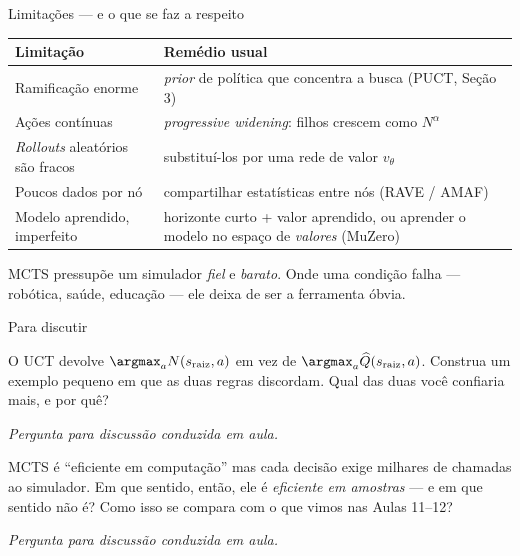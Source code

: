\documentclass[aspectratio=169, 11pt]{beamer}
\newcommand{\paradiscussao}{\smallskip
  {\footnotesize\color{rlCinza}\itshape Pergunta para discussão conduzida em aula.}}
\newcommand{\Nv}[1]{N(#1)}                      %
\newcommand{\Qh}{\widehat{Q}}                   %
\newcommand{\raiz}{s_{\mathrm{raiz}}}
\begin{document}
\begin{frame}{Limitações --- e o que se faz a respeito}
  \centering
  {\small
  \begin{tabular}{@{}p{4.3cm}p{7.4cm}@{}}
    \toprule
    \textbf{Limitação} & \textbf{Remédio usual} \\
    \midrule
    Ramificação enorme &
      \emph{prior} de política que concentra a busca (PUCT, Seção 3) \\
    Ações contínuas &
      \emph{progressive widening}: filhos crescem como $N^{\alpha}$ \\
    \emph{Rollouts} aleatórios são fracos &
      substituí-los por uma rede de valor $v_\theta$ \\
    Poucos dados por nó &
      compartilhar estatísticas entre nós (RAVE / AMAF) \\[-0.1em]
    Modelo aprendido, imperfeito &
      horizonte curto + valor aprendido, ou aprender o modelo no espaço de
      \emph{valores} (MuZero) \\
    \bottomrule
  \end{tabular}}

  \vspace{-4pt}
  \raggedright
  \begin{alertabox}
    MCTS pressupõe um simulador \emph{fiel} e \emph{barato}. Onde uma condição falha --- robótica, saúde, educação --- ele deixa de ser a ferramenta óbvia.
  \end{alertabox}
\end{frame}

\begin{frame}{Para discutir}
  \begin{quizbox}{}
    O UCT devolve $\argmax_a \Nv{\raiz,a}$ em vez de $\argmax_a \Qh(\raiz,a)$.
    Construa um exemplo pequeno em que as duas regras discordam. Qual das duas
    você confiaria mais, e por quê?
  \end{quizbox}
  \paradiscussao

  \pause
  \vfill
  \begin{quizbox}{}
    MCTS é ``eficiente em computação'' mas cada decisão exige milhares de
    chamadas ao simulador. Em que sentido, então, ele é \emph{eficiente em
    amostras} --- e em que sentido não é? Como isso se compara com o que vimos
    nas Aulas 11--12?
  \end{quizbox}
  \paradiscussao
\end{frame}
\end{document}
